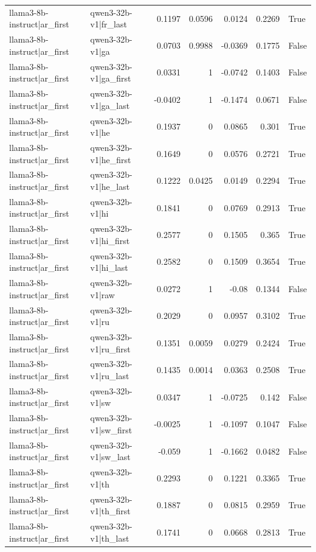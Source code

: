\begin{table}
\begin{tabular}{l l r r r r l}
llama3-8b-instruct|ar_first & qwen3-32b-v1|fr_last & 0.1197 & 0.0596 & 0.0124 & 0.2269 & True \\
llama3-8b-instruct|ar_first & qwen3-32b-v1|ga & 0.0703 & 0.9988 & -0.0369 & 0.1775 & False \\
llama3-8b-instruct|ar_first & qwen3-32b-v1|ga_first & 0.0331 & 1 & -0.0742 & 0.1403 & False \\
llama3-8b-instruct|ar_first & qwen3-32b-v1|ga_last & -0.0402 & 1 & -0.1474 & 0.0671 & False \\
llama3-8b-instruct|ar_first & qwen3-32b-v1|he & 0.1937 & 0 & 0.0865 & 0.301 & True \\
llama3-8b-instruct|ar_first & qwen3-32b-v1|he_first & 0.1649 & 0 & 0.0576 & 0.2721 & True \\
llama3-8b-instruct|ar_first & qwen3-32b-v1|he_last & 0.1222 & 0.0425 & 0.0149 & 0.2294 & True \\
llama3-8b-instruct|ar_first & qwen3-32b-v1|hi & 0.1841 & 0 & 0.0769 & 0.2913 & True \\
llama3-8b-instruct|ar_first & qwen3-32b-v1|hi_first & 0.2577 & 0 & 0.1505 & 0.365 & True \\
llama3-8b-instruct|ar_first & qwen3-32b-v1|hi_last & 0.2582 & 0 & 0.1509 & 0.3654 & True \\
llama3-8b-instruct|ar_first & qwen3-32b-v1|raw & 0.0272 & 1 & -0.08 & 0.1344 & False \\
llama3-8b-instruct|ar_first & qwen3-32b-v1|ru & 0.2029 & 0 & 0.0957 & 0.3102 & True \\
llama3-8b-instruct|ar_first & qwen3-32b-v1|ru_first & 0.1351 & 0.0059 & 0.0279 & 0.2424 & True \\
llama3-8b-instruct|ar_first & qwen3-32b-v1|ru_last & 0.1435 & 0.0014 & 0.0363 & 0.2508 & True \\
llama3-8b-instruct|ar_first & qwen3-32b-v1|sw & 0.0347 & 1 & -0.0725 & 0.142 & False \\
llama3-8b-instruct|ar_first & qwen3-32b-v1|sw_first & -0.0025 & 1 & -0.1097 & 0.1047 & False \\
llama3-8b-instruct|ar_first & qwen3-32b-v1|sw_last & -0.059 & 1 & -0.1662 & 0.0482 & False \\
llama3-8b-instruct|ar_first & qwen3-32b-v1|th & 0.2293 & 0 & 0.1221 & 0.3365 & True \\
llama3-8b-instruct|ar_first & qwen3-32b-v1|th_first & 0.1887 & 0 & 0.0815 & 0.2959 & True \\
llama3-8b-instruct|ar_first & qwen3-32b-v1|th_last & 0.1741 & 0 & 0.0668 & 0.2813 & True \\

\end{tabular}
\end{table}
